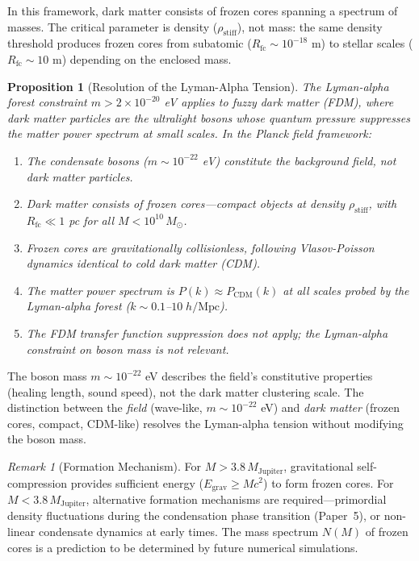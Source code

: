 \documentclass[11pt,a4paper]{article}
\newcommand{\rhostiff}{\ensuremath{\rho_{\mathrm{stiff}}}}
\newtheorem{proposition}[theorem]{Proposition}
\theoremstyle{definition}
\theoremstyle{remark}
\newtheorem{remark}[theorem]{Remark}
\begin{document}
In this framework, dark matter consists of frozen cores spanning a spectrum of masses. The critical parameter is density ($\rhostiff$), not mass: the same density threshold produces frozen cores from subatomic ($R_{\mathrm{fc}} \sim 10^{-18}$ m) to stellar scales ($R_{\mathrm{fc}} \sim 10$ m) depending on the enclosed mass.

\begin{proposition}[Resolution of the Lyman-Alpha Tension]
\label{prop:lyman_resolution}
The Lyman-alpha forest constraint $m > 2 \times 10^{-20}$ eV \cite{RogersPeiris2021} applies to fuzzy dark matter (FDM), where dark matter particles \emph{are} the ultralight bosons whose quantum pressure suppresses the matter power spectrum at small scales. In the Planck field framework:
\begin{enumerate}[leftmargin=*, itemsep=0.2em]
\item The condensate bosons ($m \sim 10^{-22}$ eV) constitute the \emph{background field}, not dark matter particles.
\item Dark matter consists of \emph{frozen cores}---compact objects at density $\rhostiff$, with $R_{\mathrm{fc}} \ll 1$ pc for all $M < 10^{10}\,M_\odot$.
\item Frozen cores are gravitationally collisionless, following Vlasov-Poisson dynamics identical to cold dark matter (CDM).
\item The matter power spectrum is $P(k) \approx P_{\mathrm{CDM}}(k)$ at all scales probed by the Lyman-alpha forest ($k \sim 0.1$--$10\;h/\mathrm{Mpc}$).
\item The FDM transfer function suppression does not apply; the Lyman-alpha constraint on boson mass is not relevant.
\end{enumerate}
\end{proposition}

The boson mass $m \sim 10^{-22}$ eV describes the field's constitutive properties (healing length, sound speed), not the dark matter clustering scale. The distinction between the \emph{field} (wave-like, $m \sim 10^{-22}$ eV) and \emph{dark matter} (frozen cores, compact, CDM-like) resolves the Lyman-alpha tension without modifying the boson mass.

\begin{remark}[Formation Mechanism]
\label{rem:formation}
For $M > 3.8\,M_{\mathrm{Jupiter}}$, gravitational self-compression provides sufficient energy ($E_{\mathrm{grav}} \geq Mc^2$) to form frozen cores. For $M < 3.8\,M_{\mathrm{Jupiter}}$, alternative formation mechanisms are required---primordial density fluctuations during the condensation phase transition (Paper~5), or non-linear condensate dynamics at early times. The mass spectrum $N(M)$ of frozen cores is a prediction to be determined by future numerical simulations.
\end{remark}
\end{document}
